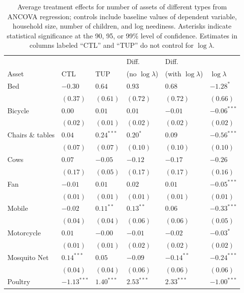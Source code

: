 \documentclass[12pt,letterpaper]{article}
\begin{document}
\begin{table}[htb]
\caption{\label{tab:orgtable2}
Average treatment effects for number of assets of different types from ANCOVA regression; controls include baseline values of dependent variable, household size, number of children, and log neediness.  Asterisks indicate statistical significance at the 90, 95, or 99\% level of confidence.  Estimates in columns labeled ``CTL'' and ``TUP'' do not control for \(\log\lambda\).}
\centering
\begin{tabular}{llllll}
 &  &  & Diff. & Diff. & \\
Asset & CTL & TUP & (no \(\log\lambda\)) & (with \(\log\lambda\)) & \(\log\lambda\)\\
\hline
Bed & \(-0.30\) & \(0.64\) & \(0.93\) & \(0.68\) & \(-1.28^{*}\)\\
 & \((0.37)\) & \((0.61)\) & \((0.72)\) & \((0.72)\) & \((0.66)\)\\
Bicycle & \(0.00\) & \(0.01\) & \(0.01\) & \(-0.01\) & \(-0.06^{***}\)\\
 & \((0.02)\) & \((0.01)\) & \((0.02)\) & \((0.02)\) & \((0.02)\)\\
Chairs \& tables & \(0.04\) & \(0.24^{***}\) & \(0.20^{*}\) & \(0.09\) & \(-0.56^{***}\)\\
 & \((0.07)\) & \((0.07)\) & \((0.10)\) & \((0.10)\) & \((0.10)\)\\
Cows & \(0.07\) & \(-0.05\) & \(-0.12\) & \(-0.17\) & \(-0.26\)\\
 & \((0.17)\) & \((0.05)\) & \((0.17)\) & \((0.17)\) & \((0.16)\)\\
Fan & \(-0.01\) & \(0.01\) & \(0.02\) & \(0.01\) & \(-0.05^{***}\)\\
 & \((0.01)\) & \((0.01)\) & \((0.01)\) & \((0.01)\) & \((0.01)\)\\
Mobile & \(-0.02\) & \(0.11^{**}\) & \(0.13^{**}\) & \(0.06\) & \(-0.33^{***}\)\\
 & \((0.04)\) & \((0.04)\) & \((0.06)\) & \((0.06)\) & \((0.05)\)\\
Motorcycle & \(0.01\) & \(-0.00\) & \(-0.01\) & \(-0.02\) & \(-0.03^{*}\)\\
 & \((0.01)\) & \((0.01)\) & \((0.02)\) & \((0.02)\) & \((0.02)\)\\
Mosquito Net & \(0.14^{***}\) & \(0.05\) & \(-0.09\) & \(-0.14^{**}\) & \(-0.24^{***}\)\\
 & \((0.04)\) & \((0.04)\) & \((0.06)\) & \((0.06)\) & \((0.06)\)\\
Poultry & \(-1.13^{***}\) & \(1.40^{***}\) & \(2.53^{***}\) & \(2.33^{***}\) & \(-1.00^{***}\)\\

\end{tabular}
\end{table}
\end{document}
